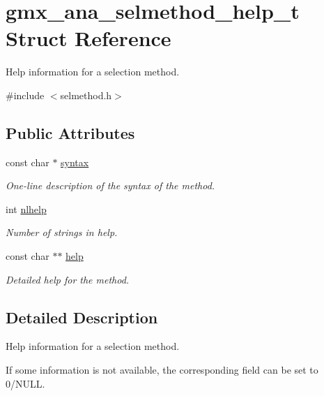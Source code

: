 \hypertarget{structgmx__ana__selmethod__help__t}{\section{gmx\-\_\-ana\-\_\-selmethod\-\_\-help\-\_\-t \-Struct \-Reference}
\label{structgmx__ana__selmethod__help__t}
}


\-Help information for a selection method.  




{\ttfamily \#include $<$selmethod.\-h$>$}

\subsection*{\-Public \-Attributes}
\begin{DoxyCompactItemize}
\item 
const char $\ast$ \hyperlink{structgmx__ana__selmethod__help__t_ab1bf90801f829a203379df9368b20265}{syntax}
\begin{DoxyCompactList}\small\item\em \-One-\/line description of the syntax of the method. \end{DoxyCompactList}\item 
int \hyperlink{structgmx__ana__selmethod__help__t_a6c9953d18124d498c25625b5bbe93ca2}{nlhelp}
\begin{DoxyCompactList}\small\item\em \-Number of strings in {\ttfamily help}. \end{DoxyCompactList}\item 
const char $\ast$$\ast$ \hyperlink{structgmx__ana__selmethod__help__t_a8298b122a3bd91a8ca635a363f2a8562}{help}
\begin{DoxyCompactList}\small\item\em \-Detailed help for the method. \end{DoxyCompactList}\end{DoxyCompactItemize}


\subsection{\-Detailed \-Description}
\-Help information for a selection method. 

\-If some information is not available, the corresponding field can be set to 0/\-N\-U\-L\-L. 

